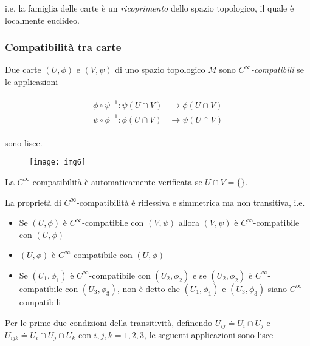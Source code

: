 i.e. la famiglia delle carte è un \textit{ricoprimento} dello spazio topologico, il quale è localmente euclideo.

\subsubsection{Compatibilità tra carte}

Due carte $ (U,\phi) $ e $ (V,\psi) $ di uno spazio topologico $ M $ sono $ C^{\infty} $\textit{-compatibili} se le applicazioni

\begin{align}
	\begin{split}
		\phi \circ \psi^{-1} : \psi(U \cap V) &\to \phi(U \cap V)\\
		\psi \circ \phi^{-1} : \phi(U \cap V) &\to \psi(U \cap V)
	\end{split}
\end{align}

sono lisce.

\begin{figure}[H]
	\centering
	\texttt{[image: img6]}
\end{figure}

\begin{remark}
	La $ C^{\infty} $-compatibilità è automaticamente verificata se $ U \cap V = \{\} $.
\end{remark}

\begin{remark}
	La proprietà di $ C^{\infty} $-compatibilità è riflessiva e simmetrica ma non transitiva, i.e.
	
	\begin{itemize}
		\item Se $ (U,\phi) $ è $ C^{\infty} $-compatibile con $ (V,\psi) $ allora $ (V,\psi) $ è $ C^{\infty} $-compatibile con $ (U,\phi) $
		
		\item $ (U,\phi) $ è $ C^{\infty} $-compatibile con $ (U,\phi) $
		
		\item Se $ (U_{1},\phi_{1}) $ è $ C^{\infty} $-compatibile con $ (U_{2},\phi_{2}) $ e se $ (U_{2},\phi_{2}) $ è $ C^{\infty} $-compatibile con $ (U_{3},\phi_{3}) $, non è detto che $ (U_{1},\phi_{1}) $ e $ (U_{3},\phi_{3}) $ siano $ C^{\infty} $-compatibili
	\end{itemize}
\end{remark}

Per le prime due condizioni della transitività, definendo $ U_{ij} \doteq U_{i} \cap U_{j} $ e $ U_{ijk} \doteq U_{i} \cap U_{j} \cap U_{k} $ con $ i,j,k=1,2,3 $, le seguenti applicazioni sono lisce

